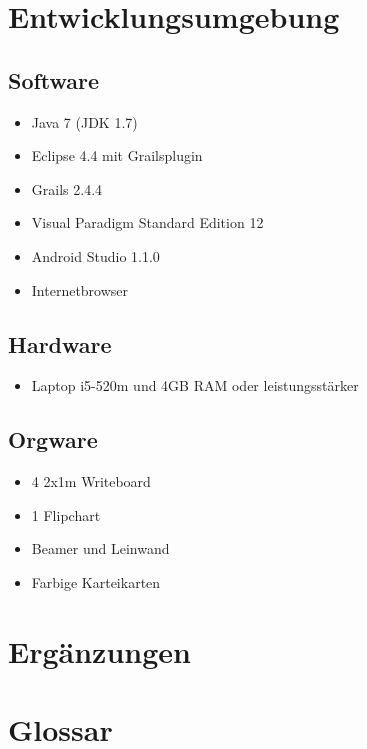 \documentclass[10pt,a4paper]{article}
\begin{document}
\section{Entwicklungsumgebung}
\subsection{Software}
\begin{itemize}
	\item Java 7 (JDK 1.7)
	\item Eclipse 4.4 mit Grailsplugin
	\item Grails 2.4.4
	\item Visual Paradigm Standard Edition 12
	\item Android Studio 1.1.0
	\item Internetbrowser
\end{itemize}
\subsection{Hardware}
\begin{itemize}
	\item Laptop i5-520m und 4GB RAM oder leistungsst\"arker
\end{itemize}
\subsection{Orgware}
\begin{itemize}
	\item 4 2x1m Writeboard
	\item 1 Flipchart
	\item Beamer und Leinwand
	\item Farbige Karteikarten
\end{itemize}
\section{Erg\"anzungen}

\section{Glossar}
\end{document}
